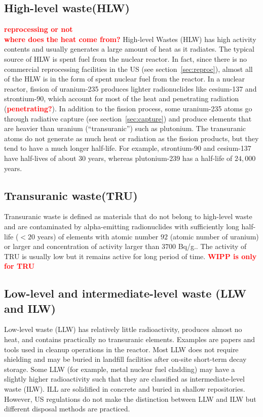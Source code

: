 \documentclass[nofootinbib,preprint,aip,pra]{revtex4-1}
\newcommand{\red}[1]{\textcolor{red}{\bf #1}}
\begin{document}
    \subsection{High-level waste(HLW)}
    \red{reprocessing or not}\\
    \red{where does the heat come from?}
    High-level Wastes (HLW) has high activity contents and usually generates a large amount of
    heat as it radiates. The typical source of HLW is spent fuel from the nuclear reactor.
    In fact, since there is no commercial reprocessing facilities in the US (see section~\ref{sec:reproc}),
    almost all of the HLW is in the form of spent nuclear fuel from the reactor. In a nuclear reactor,
    fission of uranium-235 produces lighter radionuclides like cesium-137 and strontium-90, which
    account for most of the heat and penetrating radiation (\red{penetrating?}). In addition to
    the fission process, some uranium-235 atoms go through radiative capture
    (see section~\ref{sec:capture}) and produce elements that are
    heavier than uranium (``transuranic'') such as plutonium. The transuranic atoms do not generate
    as much heat or radiation as the fission products, but they tend to have a much longer half-life.
    For example, strontium-90 and cesium-137 have half-lives of about $30$ years, whereas
    plutonium-239 has a half-life of $24,000$ years.

    \subsection{Transuranic waste(TRU)}
    \label{sec:tru}
    Transuranic waste is defined as materials that do not belong to high-level waste and are
    contaminated by alpha-emitting radionuclides with
    sufficiently long half-life ($<20$ years) of elements with atomic number $92$ (atomic number of uranium)
    or larger and concentration of activity larger than $3700$ Bq/g.\cite{j83,s01}. The activity
    of TRU is usually low but it remains active for long period of time.
    \red{WIPP is only for TRU}

    \subsection{Low-level and intermediate-level waste (LLW and ILW)}
    Low-level waste (LLW) has relatively little radioactivity, produces almost no heat,
    and contains practically no
    transuranic elements. Examples are papers and tools used in cleanup operations in the reactor.
    Most LLW does not require shielding and may be buried in landfill 
    facilities after on-site short-term decay storage.
    Some LLW (for example, metal nuclear fuel cladding) may have a slightly
    higher radioactivity such that they are classified
    as intermediate-level waste (ILW). ILL are solidified in concrete and buried in shallow
    repositories.\cite{s01} However, US regulations do not make the distinction
    between LLW and ILW but different disposal methods are practiced.\cite{nrc09, s01}
\end{document}
